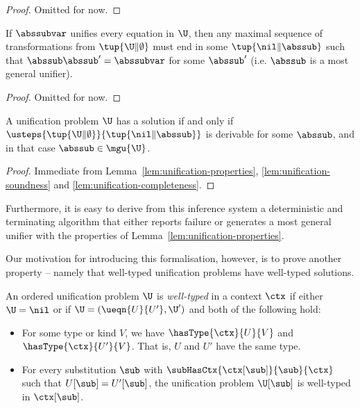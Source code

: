 \begin{proof}
Omitted for now.
\end{proof}

\begin{lemma}[Completeness]
\label{lem:unification-completeness}
If $\abssubvar$ unifies every equation in $\U$, then any maximal sequence of transformations from $\tup{\U \| \emptyset}$ must end in some $\tup{\nil \| \abssub}$ such that $\abssub \abssub' = \abssubvar$ for some $\abssub'$ (i.e. $\abssub$ is a most general unifier).
\end{lemma}

\begin{proof}
Omitted for now.
\end{proof}

\begin{lemma}[Correctness]
\label{lem:unification-correctness}
A unification problem $\U$ has a solution if and only if $\usteps{\tup{\U \| \emptyset}}{\tup{\nil \| \abssub}}$ is derivable for some $\abssub$, and in that case $\abssub \in \mgu{\U}$.
\end{lemma}

\begin{proof}
Immediate from Lemma~\ref{lem:unification-properties}, \ref{lem:unification-soundness} and \ref{lem:unification-completeness}.
\end{proof}

Furthermore, it is easy to derive from this inference system a deterministic and terminating algorithm that either reports failure or generates a most general unifier with the properties of Lemma~\ref{lem:unification-properties}.

Our motivation for introducing this formalisation, however, is to prove another property -- namely that well-typed unification problems have well-typed solutions.

\begin{definition}
\label{def:well-typed-unification-problems}
An ordered unification problem $\U$ is \emph{well-typed} in a context $\ctx$ if either $\U = \nil$ or if $\U = (\ueqn{U}{U'}, \U')$ and both of the following hold:
\begin{itemize}
	\item For some type or kind $V$, we have $\hasType{\ctx}{U}{V}$ and $\hasType{\ctx}{U'}{V}$. That is, $U$ and $U'$ have the same type.
  \item For every substitution $\sub$ with $\subHasCtx{\ctx[\sub]}{\sub}{\ctx}$ such that $U[\sub] = U'[\sub]$, the unification problem $\U[\sub]$ is well-typed in $\ctx[\sub]$.
\end{itemize}
\end{definition}


